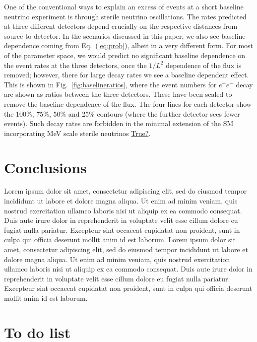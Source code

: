 \documentclass[11pt, a4paper]{article}
\newcommand{\refeq}[1]{Eq.~(\ref{#1})}
\newcommand{\reffig}[1]{Fig.~\ref{#1}}
\newcommand{\lorem}{ \textcolor[rgb]{0.8,0.8,0.8}{Lorem ipsum dolor sit amet, consectetur
adipiscing elit, sed do eiusmod tempor incididunt ut labore et dolore magna
aliqua. Ut enim ad minim veniam, quis nostrud exercitation ullamco laboris nisi
ut aliquip ex ea commodo consequat. Duis aute irure dolor in reprehenderit in
voluptate velit esse cillum dolore eu fugiat nulla pariatur. Excepteur sint
occaecat cupidatat non proident, sunt in culpa qui officia deserunt mollit anim
id est laborum.}}
\newcommand{\newtext}[2]{\textcolor{#1}{\ul{#2}}}
\begin{document}
One of the conventional ways to explain an excess of events at a short baseline
neutrino experiment is through sterile neutrino oscillations. The rates
predicted at three different detectors depend crucially on the respective
distances from source to detector. In the scenarios discussed in this paper, we
also see baseline dependence coming from \refeq{eq:prob}, albeit in a very
different form. For most of the parameter space, we would predict no
significant baseline dependence on the event rates at the three detectors, once
the $1/L^2$ dependence of the flux is removed; however, there for large decay
rates we see a baseline dependent effect. This is shown in
\reffig{fig:baselineratios}, where the event numbers for $e^-e^-$ decay are
shown as ratios between the three detectors. These have been scaled to remove
the baseline dependence of the flux.  The four lines for each detector show the
100\%, 75\%, 50\% and 25\% contours (where the further detector sees fewer
events). Such decay rates are forbidden in the minimal extension of the SM
incorporating MeV scale sterile neutrinos \newtext{PB}{True?}.  



\section{Conclusions}
\lorem\lorem


\newpage 

\section{To do list}
\end{document}
